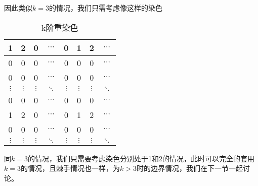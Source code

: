因此类似$k=3$的情况，我们只需考虑像这样的染色

\begin{table}[htbp]
	\centering
	\caption{k阶重染色}
	\begin{tabular}{|c|c|c|c|c|c|c|c|}
		\hline
		1        & 2        & 0        & $\cdots$ & 0        & 1        & 2        & $\cdots$ \\
		\hline
		0        & 0        & 0        & $\cdots$ & 0        & 0        & 0        & $\cdots$ \\
		\hline
		0        & 0        & 0        & $\cdots$ & 0        & 0        & 0        & $\cdots$ \\
		\hline
		$\vdots$ & $\vdots$ & $\vdots$ & $\ddots$ & $\vdots$ & $\vdots$ & $\vdots$ & $\ddots$ \\
		\hline
		0        & 0        & 0        & $\cdots$ & 0        & 0        & 0        & $\cdots$ \\
		\hline
		1        & 2        & 0        & $\cdots$ & 0        & 1        & 2        & $\cdots$ \\
		\hline
		0        & 0        & 0        & $\cdots$ & 0        & 0        & 0        & $\cdots$ \\
		\hline
		$\vdots$ & $\vdots$ & $\vdots$ & $\ddots$ & $\vdots$ & $\vdots$ & $\vdots$ & $\ddots$ \\
		\hline
	\end{tabular}
	\label{fig:k-order-staining-last}
\end{table}

同$k=3$的情况，我们只需要考虑染色分别处于1和2的情况，此时可以完全的套用$k=3$的情况，且棘手情况也一样，为$k>3$时的边界情况，我们在下一节一起讨论。

\clearpage